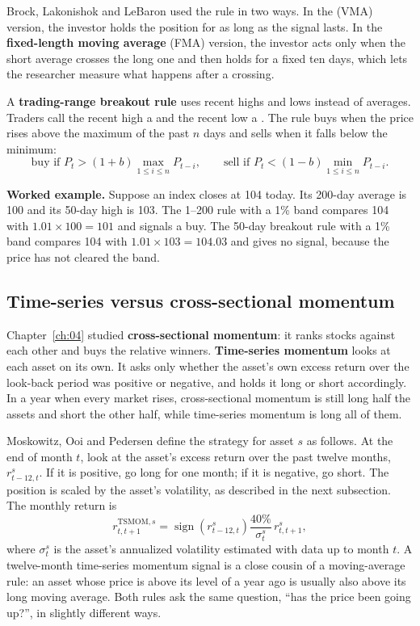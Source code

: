 Brock, Lakonishok and LeBaron used the rule in two ways. In the  (VMA) version, the investor holds the position for as long as the signal lasts. In the \textbf{fixed-length moving average} (FMA) version, the investor acts only when the short average crosses the long one and then holds for a fixed ten days, which lets the researcher measure what happens after a crossing.

A \textbf{trading-range breakout rule} uses recent highs and lows instead of averages. Traders call the recent high a  and the recent low a . The rule buys when the price rises above the maximum of the past $n$ days and sells when it falls below the minimum:
\begin{equation}
  \text{buy if } P_t > (1+b)\max_{1\le i\le n} P_{t-i}, \qquad \text{sell if } P_t < (1-b)\min_{1\le i\le n} P_{t-i}.
  \label{eq:08-trb}
\end{equation}

\textbf{Worked example.} Suppose an index closes at 104 today. Its 200-day average is 100 and its 50-day high is 103. The 1--200 rule with a 1\% band compares 104 with $1.01 \times 100 = 101$ and signals a buy. The 50-day breakout rule with a 1\% band compares 104 with $1.01 \times 103 = 104.03$ and gives no signal, because the price has not cleared the band.

\subsection{Time-series versus cross-sectional momentum}

Chapter~\ref{ch:04} studied \textbf{cross-sectional momentum}: it ranks stocks against each other and buys the relative winners. \textbf{Time-series momentum} looks at each asset on its own. It asks only whether the asset's own excess return over the look-back period was positive or negative, and holds it long or short accordingly. In a year when every market rises, cross-sectional momentum is still long half the assets and short the other half, while time-series momentum is long all of them.

Moskowitz, Ooi and Pedersen define the strategy for asset $s$ as follows. At the end of month $t$, look at the asset's excess return over the past twelve months, $r^s_{t-12,t}$. If it is positive, go long for one month; if it is negative, go short. The position is scaled by the asset's volatility, as described in the next subsection. The monthly return is
\begin{equation}
  r^{\text{TSMOM},s}_{t,t+1} = \operatorname{sign}\left(r^s_{t-12,t}\right) \frac{40\%}{\sigma^s_t}\, r^s_{t,t+1},
  \label{eq:08-tsmom}
\end{equation}
where $\sigma^s_t$ is the asset's annualized volatility estimated with data up to month $t$. A twelve-month time-series momentum signal is a close cousin of a moving-average rule: an asset whose price is above its level of a year ago is usually also above its long moving average. Both rules ask the same question, ``has the price been going up?'', in slightly different ways.

